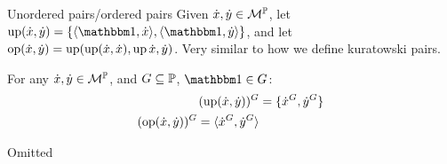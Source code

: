 \documentclass{article}
\begin{document}
\endproof
\begin{fancydefine}{Unordered pairs/ordered pairs}
    Given $\dot{x},\dot{y} \in \mathcal{M}^{\mathbb{P}}$, let $\up(\dot{x},\dot{y})=\{\langle \bbone, \dot{x} \rangle, \langle \bbone, \dot{y} \rangle \}$, and let $\operatorname{op}(\dot{x},\dot{y})= \operatorname{up}(\operatorname{up}(\dot{x},\dot{x}),\operatorname{up}{\dot{x},\dot{y}})$.
    Very similar to how we define kuratowski pairs.
\end{fancydefine}
\begin{fancyprop}{}
    For any $\dot{x}, \dot{y} \in \mathcal{M}^{\mathbb{P}}$, and $G \subseteq \mathbb{P}$, $\bbone \in G$: \begin{align*}
        (\operatorname{up}(\dot{x},\dot{y}))^{G} & = \{ \dot{x}^{G}, \dot{y}^{G}\} \\
        (\operatorname{op}(\dot{x},\dot{y}))^{G} = \langle \dot{x}^{G}, \dot{y}^{G}\rangle
    \end{align*}
\end{fancyprop}
\proof Omitted \endproof
\end{document}
